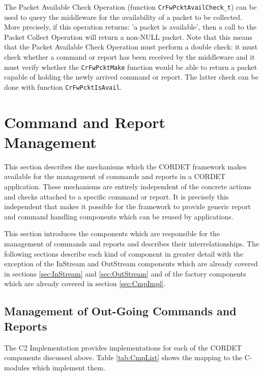 \documentclass{pnp_article}
\begin{document}
The Packet Available Check Operation (function \texttt{CrFwPcktAvailCheck\_t}) can be used to query the middleware for the availability of a packet to be collected. More precisely, if this operation returns: 'a packet is available', then a call to the Packet Collect Operation will return a non-NULL packet. Note that this means that the Packet Available Check Operation must perform a double check: it must check whether a command or report has been received by the middleware and it must verify whether the \texttt{CrFwPcktMake} function would be able to return a packet capable of holding the newly arrived command or report. The latter check can be done with function \texttt{CrFwPcktIsAvail}.


\section{Command and Report Management}\label{sec:CmdAndRepManagement}
This section describes the mechanisms which the CORDET framework makes available for the management of commands and reports in a CORDET application. These mechanisms are entirely independent of the concrete actions and checks attached to a specific command or report. It is precisely this independent that makes it possible for the framework to provide generic report and command handling components which can be reused by applications.

This section introduces the components which are responsible for the management of commands and reports and describes their interrelationships. The following sections describe each kind of component in greater detail with the exception of the InStream and OutStream components which are already covered in sections \ref{sec:InStream} and \ref{sec:OutStream} and of the factory components which are already covered in section \ref{sec:CmpImpl}.

\subsection{Management of Out-Going Commands and Reports}\label{sec:ManagementOfOutGoingCmdAndRep}


The C2 Implementation provides implementations for each of the CORDET components discussed above. Table \ref{tab:CmpList} shows the mapping to the C-modules which implement them.
\end{document}
